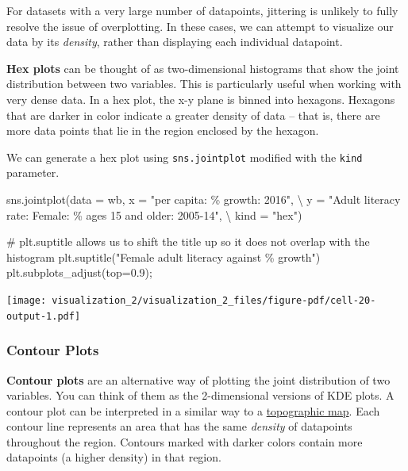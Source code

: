 \documentclass[
  letterpaper,
  DIV=11,
  numbers=noendperiod]{scrreprt}
\newenvironment{Shaded}{\begin{snugshade}}{\end{snugshade}}
\newcommand{\CommentTok}[1]{\textcolor[rgb]{0.37,0.37,0.37}{#1}}
\newcommand{\FloatTok}[1]{\textcolor[rgb]{0.68,0.00,0.00}{#1}}
\newcommand{\NormalTok}[1]{\textcolor[rgb]{0.00,0.23,0.31}{#1}}
\newcommand{\OperatorTok}[1]{\textcolor[rgb]{0.37,0.37,0.37}{#1}}
\newcommand{\SpecialCharTok}[1]{\textcolor[rgb]{0.37,0.37,0.37}{#1}}
\newcommand{\StringTok}[1]{\textcolor[rgb]{0.13,0.47,0.30}{#1}}
\begin{document}
For datasets with a very large number of datapoints, jittering is
unlikely to fully resolve the issue of overplotting. In these cases, we
can attempt to visualize our data by its \emph{density}, rather than
displaying each individual datapoint.

\textbf{Hex plots} can be thought of as two-dimensional histograms that
show the joint distribution between two variables. This is particularly
useful when working with very dense data. In a hex plot, the x-y plane
is binned into hexagons. Hexagons that are darker in color indicate a
greater density of data -- that is, there are more data points that lie
in the region enclosed by the hexagon.

We can generate a hex plot using \texttt{sns.jointplot} modified with
the \texttt{kind} parameter.

\begin{Shaded}
\begin{Highlighting}[]
\NormalTok{sns.jointplot(data }\OperatorTok{=}\NormalTok{ wb, x }\OperatorTok{=} \StringTok{"per capita: }\SpecialCharTok{\% g}\StringTok{rowth: 2016"}\NormalTok{, }\OperatorTok{\textbackslash{}}
\NormalTok{              y }\OperatorTok{=} \StringTok{"Adult literacy rate: Female: \% ages 15 and older: 2005{-}14"}\NormalTok{, }\OperatorTok{\textbackslash{}}
\NormalTok{              kind }\OperatorTok{=} \StringTok{"hex"}\NormalTok{)}

\CommentTok{\# plt.suptitle allows us to shift the title up so it does not overlap with the histogram}
\NormalTok{plt.suptitle(}\StringTok{"Female adult literacy against }\SpecialCharTok{\% g}\StringTok{rowth"}\NormalTok{)}
\NormalTok{plt.subplots\_adjust(top}\OperatorTok{=}\FloatTok{0.9}\NormalTok{)}\OperatorTok{;}
\end{Highlighting}
\end{Shaded}

\texttt{[image: visualization\_2/visualization\_2\_files/figure-pdf/cell-20-output-1.pdf]}

\subsubsection{Contour Plots}\label{contour-plots}

\textbf{Contour plots} are an alternative way of plotting the joint
distribution of two variables. You can think of them as the
2-dimensional versions of KDE plots. A contour plot can be interpreted
in a similar way to a
\href{https://gisgeography.com/contour-lines-topographic-map/}{topographic
map}. Each contour line represents an area that has the same
\emph{density} of datapoints throughout the region. Contours marked with
darker colors contain more datapoints (a higher density) in that region.
\end{document}
